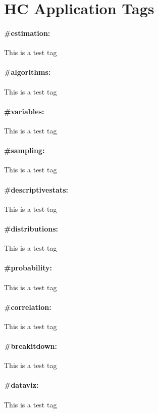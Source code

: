 \documentclass[./main.tex]{subfiles}
\begin{document}
\section{HC Application Tags}
\paragraph*{\textbf{\#estimation:}}\label{hc:estimation} This is a test tag
\paragraph*{\textbf{\#algorithms:}}\label{hc:algorithms} This is a test tag
\paragraph*{\textbf{\#variables:}}\label{hc:variables} This is a test tag
\paragraph*{\textbf{\#sampling:}}\label{hc:sampling} This is a test tag

\paragraph*{\textbf{\#descriptivestats:}}\label{hc:descriptivestats} This is a test tag
\paragraph*{\textbf{\#distributions:}}\label{hc:distributions} This is a test tag
\paragraph*{\textbf{\#probability:}}\label{hc:probability} This is a test tag
\paragraph*{\textbf{\#correlation:}}\label{hc:correlation} This is a test tag
\paragraph*{\textbf{\#breakitdown:}}\label{hc:breakitdown} This is a test tag
\paragraph*{\textbf{\#dataviz:}}\label{hc:dataviz} This is a test tag
\end{document}
